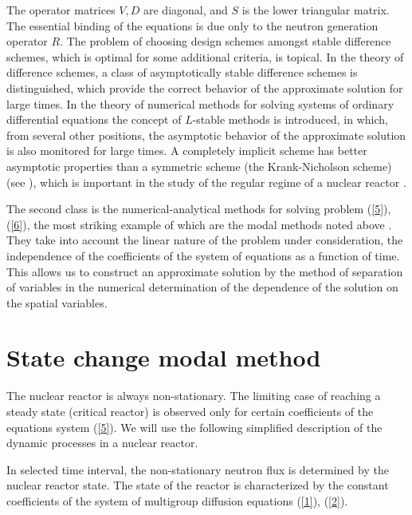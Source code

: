 \documentclass[authoryear]{elsarticle}
\begin{document}
The operator matrices  $V, D$ are diagonal, and  $S$ is the lower triangular matrix. The essential binding of the equations is due only to the neutron generation operator $R$.
The problem of choosing design schemes amongst stable difference schemes, which is optimal for some additional criteria, is topical. In the theory of difference schemes, a class of asymptotically stable difference schemes is distinguished, which  \citep{samarskii1996computational} provide the correct behavior of the approximate solution for large times. In the theory of numerical methods for solving systems of ordinary differential equations  \citep{Butcher2008,Gear1971} the concept of  $L$-stable methods is introduced, in which, from several other positions, the asymptotic behavior of the approximate solution is also monitored for large times. A completely implicit scheme has better asymptotic properties than a symmetric scheme (the Krank-Nicholson scheme)  (see \cite{VabishchevichSM}), 
which is important in the study of the regular regime of a nuclear reactor \citep{nd-mm}.

The second class is the numerical-analytical methods for solving problem  (\ref{5}), (\ref{6}),
the most striking example of which are the modal methods noted above \citep{stacey1967modal,stacey1969space,sutton1996diffusion}.
They take into account the linear nature of the problem under consideration, the independence of the coefficients of the system of equations as a function of time. This allows us to construct an approximate solution by the method of separation of variables in the numerical determination of the dependence of the solution on the spatial variables.

\section{State change modal method} 

The nuclear reactor is always non-stationary. The limiting case of reaching a steady state (critical reactor) is observed only for certain coefficients of the equations system (\ref{5}). 
We will use the following simplified description of the dynamic processes in a nuclear reactor.

In selected time interval, the non-stationary neutron flux is determined by the nuclear reactor state. The state of the reactor is characterized by the constant coefficients of the system of multigroup diffusion equations (\ref{1}), (\ref{2}).
\end{document}
